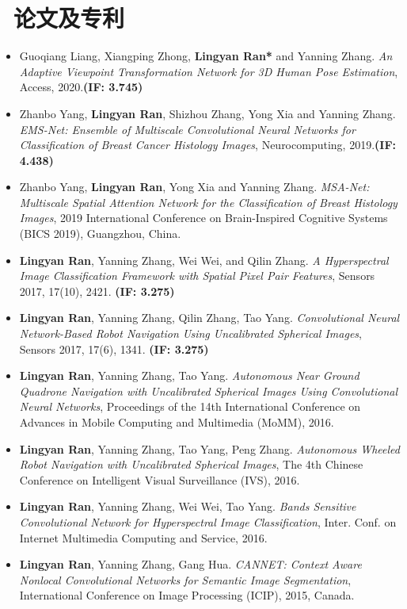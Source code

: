 \documentclass{resume}
\begin{document}
\section{\faFile\ 论文及专利}
\begin{itemize}
  \item Guoqiang Liang, Xiangping Zhong, \textbf{Lingyan Ran*} and Yanning Zhang. \textit{An Adaptive Viewpoint Transformation Network for 3D Human Pose Estimation}, Access, 2020.\textbf{(IF: 3.745)}
  \item Zhanbo Yang, \textbf{Lingyan Ran}, Shizhou Zhang, Yong Xia and Yanning Zhang. \textit{EMS-Net: Ensemble of Multiscale Convolutional Neural Networks for Classification of Breast Cancer Histology Images}, Neurocomputing, 2019.\textbf{(IF: 4.438)}
  \item Zhanbo Yang, \textbf{Lingyan Ran}, Yong Xia and Yanning Zhang. \textit{MSA-Net: Multiscale Spatial Attention Network for the Classification of Breast Histology Images}, 2019 International Conference on Brain-Inspired Cognitive Systems (BICS 2019), Guangzhou, China.
	\item \textbf{Lingyan Ran}, Yanning Zhang, Wei Wei, and Qilin Zhang. \textit{A Hyperspectral Image Classification Framework with Spatial Pixel Pair Features}, Sensors 2017, 17(10), 2421. \textbf{(IF: 3.275)}
	\item \textbf{Lingyan Ran}, Yanning Zhang, Qilin Zhang, Tao Yang. \textit{Convolutional Neural Network-Based Robot Navigation Using Uncalibrated Spherical Images}, Sensors 2017, 17(6), 1341. \textbf{(IF: 3.275)}
	\item \textbf{Lingyan Ran}, Yanning Zhang, Tao Yang. \textit{Autonomous Near Ground Quadrone Navigation
 with Uncalibrated Spherical Images Using Convolutional Neural Networks}, Proceedings of the 14th International Conference on Advances in Mobile Computing and Multimedia (MoMM), 2016.
  \item \textbf{Lingyan Ran}, Yanning Zhang, Tao Yang, Peng Zhang. \textit{Autonomous Wheeled Robot Navigation with Uncalibrated Spherical Images}, The 4th Chinese Conference on Intelligent Visual Surveillance (IVS), 2016.
  \item \textbf{Lingyan Ran}, Yanning Zhang, Wei Wei, Tao Yang. \textit{Bands Sensitive Convolutional Network for Hyperspectral Image Classification}, Inter. Conf. on Internet Multimedia Computing and Service, 2016.
  \item \textbf{Lingyan Ran}, Yanning Zhang, Gang Hua. \textit{CANNET: Context Aware Nonlocal Convolutional Networks for Semantic Image Segmentation}, International Conference on Image Processing (ICIP), 2015, Canada. %

\end{itemize}
\end{document}
